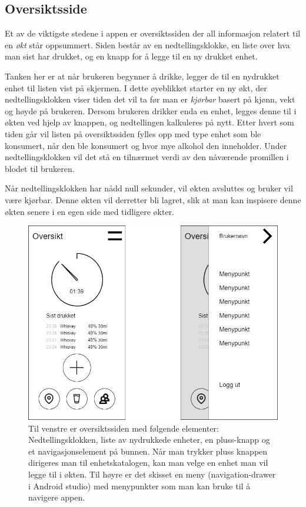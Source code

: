 \documentclass[12pt]{article}
\begin{document}
\subsection{Oversiktsside}
Et av de viktigste stedene i appen er oversiktssiden der all informasjon relatert til en \textit{økt} står oppsummert. Siden består av en nedtellingsklokke, en liste over hva man sist har drukket, og en knapp for å legge til en ny drukket enhet. 

Tanken her er at når brukeren begynner å drikke, legger de til en nydrukket enhet til listen vist på skjermen. I dette øyeblikket starter en ny økt, der nedtellingsklokken viser tiden det vil ta før man er \textit{kjørbar} basert på kjønn, vekt og høyde på brukeren. Dersom brukeren drikker enda en enhet, legges denne til i økten ved hjelp av knappen, og nedtellingen kalkuleres på nytt. Etter hvert som tiden går vil listen på oversiktssiden fylles opp med type enhet som ble konsumert, når den ble konsumert og hvor mye alkohol den inneholder. Under nedtellingsklokken vil det stå en tilnærmet verdi av den nåværende promillen i blodet til brukeren. 

Når nedtellingsklokken har nådd null sekunder, vil økten avsluttes og bruker vil være kjørbar. Denne økten vil derretter bli lagret, slik at man kan inspisere denne økten senere i en egen side med tidligere økter. 

\begin{figure}[H]
    \centering
    \includegraphics[scale=0.4]{images/lille_promille_frontpage.drawio.png}
    \caption{Til venstre er oversiktssiden med følgende elementer: Nedtellingsklokken, liste av nydrukkede enheter, en pluss-knapp og et navigasjonselement på bunnen. Når man trykker pluss knappen dirigeres man til enhetskatalogen, kan man velge en enhet man vil legge til i økten. Til høyre er det skisset en meny (navigation-drawer i Android studio) med menypunkter som man kan bruke til å navigere appen.}
\end{figure}
\end{document}
